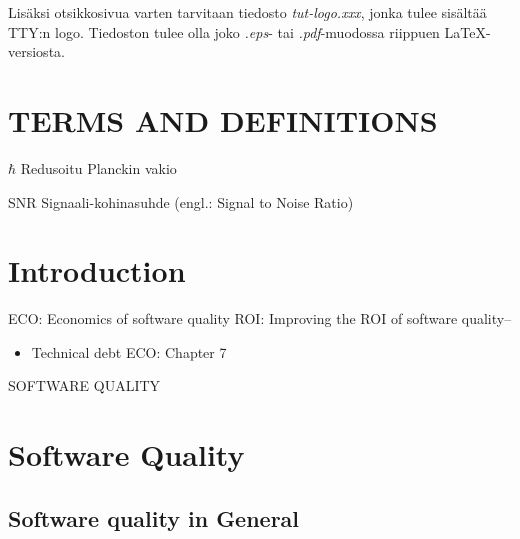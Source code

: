 \documentclass[12pt,a4paper,finnish]{tutthesis}
\begin{document}
Lisäksi otsikkosivua varten tarvitaan tiedosto \textit{tut-logo.xxx}, jonka
tulee sisältää TTY:n logo. Tiedoston tulee
olla joko \textit{.eps}- tai \textit{.pdf}-muodossa riippuen \LaTeX-versiosta.
 
\newpage
\tableofcontents
\newpage
\chapter*{TERMS AND DEFINITIONS}
 
 
\begin{termiluettelo}
 
\item [$\hbar$] Redusoitu Planckin vakio
\item [SNR] Signaali-kohinasuhde (engl.: Signal to Noise Ratio)
 
\end{termiluettelo} 
 
 
\newpage
\renewcommand{\chaptermark}[1]{\markboth{\thechapter. \ #1}{}}
\renewcommand{\sectionmark}[1]{\markright{}{}}
\lhead{\fancyplain{}{\leftmark}}
 
 
\chapter{Introduction}
 
 ECO: Economics of software quality
 ROI: Improving the ROI of software quality--
 
 \begin{itemize}




 \item Technical debt ECO: Chapter 7
 
 \end{itemize} 
 

 SOFTWARE QUALITY

 
 \chapter{Software Quality}
 
  \section{Software quality in General}
 
\end{document}
